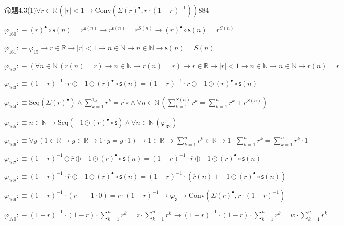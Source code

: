 \begin{fullproof}{命題4.3(1)}{$\forall r \in \mathbb{R}\,(\lvert r \rvert < 1 \to \mathrm{Conv}(\Sigma {(r)^{\bullet}},r \cdot (1 - r)^{-1}))$}{884}
\begin{abbrevlist}
\item $\varphi_{160} :\equiv {(r)^{\bullet}} \circ \mathsf{s}(n) = {{r}^{\mathsf{s}(n)}} \to {{r}^{\mathsf{s}(n)}} = {{r}^{S(n)}} \to {(r)^{\bullet}} \circ \mathsf{s}(n) = {{r}^{S(n)}}$
\item $\varphi_{161} :\equiv \varphi_{15} \to r \in \mathbb{R} \to \lvert r \rvert < 1 \to n \in \mathbb{N} \to n \in \mathbb{N} \to \mathsf{s}(n) = S(n)$
\item $\varphi_{162} :\equiv (\forall n \in \mathbb{N}\,(\overline{r}(n) = r) \to n \in \mathbb{N} \to \overline{r}(n) = r) \to r \in \mathbb{R} \to \lvert r \rvert < 1 \to n \in \mathbb{N} \to n \in \mathbb{N} \to \overline{r}(n) = r$
\item $\varphi_{163} :\equiv (1 - r)^{-1} \cdot \overline{r} \oplus -1 \odot {(r)^{\bullet}} \circ \mathsf{s}(n) = (1 - r)^{-1} \cdot \overline{r} \oplus -1 \odot {(r)^{\bullet}} \circ \mathsf{s}(n)$
\item $\varphi_{164} :\equiv \mathrm{Seq}(\Sigma {(r)^{\bullet}}) \land {\textstyle\sum_{k=1}^{1_{\omega}} {{r}^{k}}} = {{r}^{1_{\omega}}} \land \forall n \in \mathbb{N}\,({\textstyle\sum_{k=1}^{S(n)} {{r}^{k}}} = {\textstyle\sum_{k=1}^{n} {{r}^{k}}} + {{r}^{S(n)}})$
\item $\varphi_{165} :\equiv n \in \mathbb{N} \to \mathrm{Seq}(-1 \odot {(r)^{\bullet}} \circ \mathsf{s}) \land \forall n \in \mathbb{N}\,(\varphi_{32})$
\item $\varphi_{166} :\equiv \forall y\,(1 \in \mathbb{R} \to y \in \mathbb{R} \to 1 \cdot y = y \cdot 1) \to 1 \in \mathbb{R} \to {\textstyle\sum_{k=1}^{n} {{r}^{k}}} \in \mathbb{R} \to 1 \cdot {\textstyle\sum_{k=1}^{n} {{r}^{k}}} = {\textstyle\sum_{k=1}^{n} {{r}^{k}}} \cdot 1$
\item $\varphi_{167} :\equiv (1 - r)^{-1} \odot \overline{r} \oplus -1 \odot {(r)^{\bullet}} \circ \mathsf{s}(n) = (1 - r)^{-1} \cdot \overline{r} \oplus -1 \odot {(r)^{\bullet}} \circ \mathsf{s}(n)$
\item $\varphi_{168} :\equiv (1 - r)^{-1} \cdot \overline{r} \oplus -1 \odot {(r)^{\bullet}} \circ \mathsf{s}(n) = (1 - r)^{-1} \cdot (\overline{r}(n) + -1 \odot {(r)^{\bullet}} \circ \mathsf{s}(n))$
\item $\varphi_{169} :\equiv (1 - r)^{-1} \cdot (r + -1 \cdot 0) = r \cdot (1 - r)^{-1} \to \varphi_{3} \to \mathrm{Conv}(\Sigma {(r)^{\bullet}},r \cdot (1 - r)^{-1})$
\item $\varphi_{170} :\equiv (1 - r)^{-1} \cdot (1 - r) \cdot {\textstyle\sum_{k=1}^{n} {{r}^{k}}} = z \cdot {\textstyle\sum_{k=1}^{n} {{r}^{k}}} \to (1 - r)^{-1} \cdot (1 - r) \cdot {\textstyle\sum_{k=1}^{n} {{r}^{k}}} = w \cdot {\textstyle\sum_{k=1}^{n} {{r}^{k}}}$

\end{abbrevlist}
\end{fullproof}

